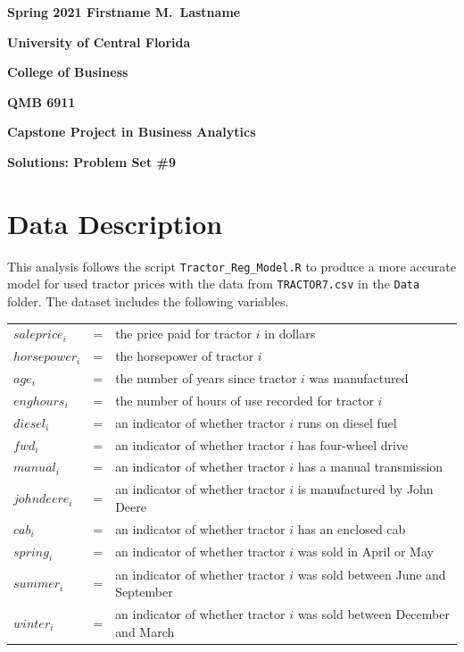 \documentclass[11pt]{paper}
\begin{document}

\pagestyle{empty}
{\noindent\bf Spring 2021 \hfill Firstname M.~Lastname}
\vskip 16pt
\centerline{\bf University of Central Florida}
\centerline{\bf College of Business}
\vskip 16pt
\centerline{\bf QMB 6911}
\centerline{\bf Capstone Project in Business Analytics}
\vskip 10pt
\centerline{\bf Solutions:  Problem Set \#9}
\vskip 32pt
\noindent
% 
\section{Data Description}

This analysis follows the script \texttt{Tractor\_Reg\_Model.R} to produce a more accurate model for used tractor prices with the data from \texttt{TRACTOR7.csv} in the \texttt{Data} folder. 
The dataset includes the following variables.
\begin{table}[h!]
\begin{tabular}{l l l}

$saleprice_i$ & = & the price paid for tractor $i$ in dollars \\
% 
$horsepower_i$ & = & the horsepower of tractor $i$ \\
$age_i$ & = & the number of years since tractor $i$ was manufactured  \\
$enghours_i$ & = & the number of hours of use recorded for tractor $i$  \\
$diesel_i$ & = & an indicator of whether tractor $i$ runs on diesel fuel \\ %
$fwd_i$ & = & an indicator of whether tractor $i$ has four-wheel drive \\ %
$manual_i$ & = & an indicator of whether tractor $i$ has a manual transmission \\ %
$johndeere_i$ & = & an indicator of whether tractor $i$ is manufactured by John Deere \\ %
$cab_i$ & = & an indicator of whether tractor $i$ has an enclosed cab \\ %
% 
$spring_i$ & = & an indicator of whether tractor $i$ was sold in April or May \\ %
$summer_i$ & = & an indicator of whether tractor $i$ was sold between June and September \\ %
$winter_i$ & = & an indicator of whether tractor $i$ was sold between December and March \\ %

\end{tabular}
\end{table}
%
\end{document}
